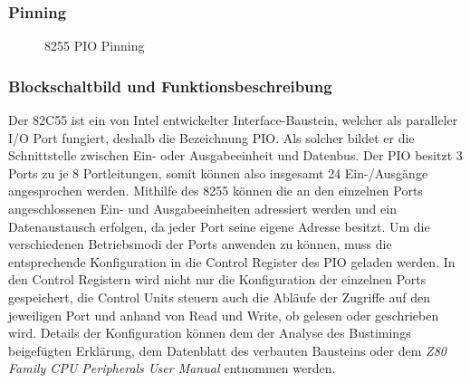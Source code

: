 \subsubsection{Pinning}
\begin{figure}[htb]
    \qquad
    \qquad
    \caption[Z80 PIO Pinning]{8255 PIO Pinning \cite{z80:pio}}
    \label{fig:z80-pio-pinning}
\end{figure}

\subsubsection{Blockschaltbild und Funktionsbeschreibung}
Der 82C55 ist ein von Intel entwickelter Interface-Baustein, welcher als paralleler I/O Port fungiert, deshalb die Bezeichnung PIO. Als solcher bildet er die Schnittstelle zwischen Ein- oder Ausgabeeinheit und Datenbus. Der PIO besitzt 3 Ports zu je 8 Portleitungen, somit können also insgesamt 24 Ein-/Ausgänge angesprochen werden. Mithilfe des 8255 können die an den einzelnen Ports angeschlossenen Ein- und Ausgabeeinheiten adressiert werden und ein Datenaustausch erfolgen, da jeder Port seine eigene Adresse besitzt. Um die verschiedenen Betriebsmodi der Ports anwenden zu können, muss die entsprechende Konfiguration in die Control Register des PIO geladen werden. In den Control Registern wird nicht nur die Konfiguration der einzelnen Ports gespeichert, die Control Units steuern auch die Abläufe der Zugriffe auf den jeweiligen Port und anhand von Read und Write, ob gelesen oder geschrieben wird. Details der Konfiguration können dem der Analyse des Bustimings beigefügten Erklärung, dem Datenblatt des verbauten Bausteins oder dem \textit{Z80 Family CPU Peripherals User Manual \cite{z80:periph}} entnommen werden.

